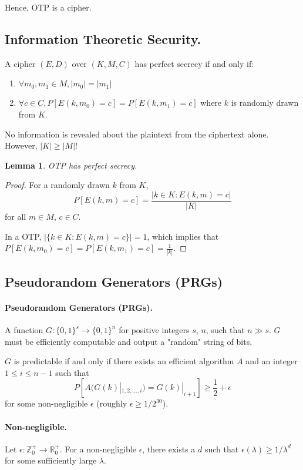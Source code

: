\documentclass{article}
\newtheorem{lemma}{Lemma}
\begin{document}
Hence, OTP is a cipher.

\subsection{Information Theoretic Security.} A cipher $(E, D)$ over $(K, M, C)$ has perfect secrecy if and only if: \begin{enumerate}
  \item $\forall m_0, m_1 \in M, |m_0| = |m_1|$
  \item $\forall c \in C, P[E(k, m_0) = c] = P[E(k, m_1) = c]$ where $k$ is randomly drawn from $K$.
\end{enumerate}

No information is revealed about the plaintext from the ciphertext alone. However, $|K| \geq |M|$!

\begin{lemma}
  OTP has perfect secrecy.
\end{lemma}

\begin{proof}
  For a randomly drawn $k$ from $K$, $$P[E(k, m) = c] = \frac{|{k \in K: E(k, m) = c}|}{|K|}$$ for all $m \in M$, $c \in C$.

  In a OTP, $|\{k \in K: E(k, m) = c\}| = 1$, which implies that $P[E(k, m_0) = c] = P[E(k, m_1) = c] = \frac{1}{|k|}$.
\end{proof}

\subsection{Pseudorandom Generators (PRGs)}

\paragraph{Pseudorandom Generators (PRGs).} A function $G: \{0, 1\}^s \rightarrow \{0, 1\}^n$ for positive integers $s$, $n$, such that $n \gg s$. $G$ must be efficiently computable and output a "random" string of bits.

$G$ is predictable if and only if there exists an efficient algorithm $A$ and an integer $1 \leq i \leq n-1$ such that \begin{equation}
  P[A(G(k)|_{1,2,\ldots,i}) = G(k)|_{i+1}] \geq \frac{1}{2} + \epsilon \label{prg:pred}
\end{equation} for some non-negligible $\epsilon$ (roughly $\epsilon \geq 1/2^{30}$).

\paragraph{Non-negligible.} Let $\epsilon: \mathbb{Z}^+_0 \rightarrow \mathbb{R}^+_0$. For a non-negligible $\epsilon$, there exists a $d$ such that $\epsilon(\lambda) \geq 1/\lambda^d$ for some sufficiently large $\lambda$.
\end{document}
